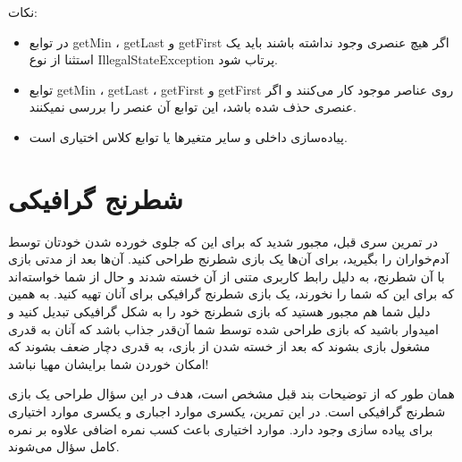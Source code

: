 \documentclass[]{article}
\begin{document}
نکات:
\begin{itemize}
\item در توابع getMin ، getLast و getFirst اگر هیچ عنصری وجود نداشته باشند باید یک استثنا از نوع IllegalStateException پرتاب شود.

\item توابع getMin ، getLast ، getFirst و getFirst روی عناصر موجود کار می‌کنند و اگر عنصری حذف شده باشد، این توابع آن عنصر را بررسی نمیکنند.
\item پیاده‌سازی داخلی و سایر متغیرها یا توابع کلاس اختیاری است.

\end{itemize}
\newpage




\section{شطرنج گرافیکی}


در تمرین سری قبل، مجبور شدید که برای این که جلوی خورده شدن خودتان توسط آدم‌خواران را بگیرید، برای آن‌ها یک بازی شطرنج طراحی کنید. آن‌ها بعد از مدتی بازی با آن شطرنج، به دلیل رابط کاربری متنی از آن خسته شدند و حال از شما خواسته‌اند که برای این که شما را نخورند، یک بازی شطرنج گرافیکی برای آنان تهیه کنید. به همین دلیل شما هم مجبور هستید که بازی شطرنج خود را به شکل گرافیکی تبدیل کنید و امیدوار باشید که بازی طراحی شده توسط شما آن‌قدر جذاب باشد که آنان به قدری مشغول بازی بشوند که بعد از خسته شدن از بازی، به قدری دچار ضعف بشوند که امکان خوردن شما برایشان مهیا نباشد!




همان طور که از توضیحات بند قبل مشخص است، هدف در این سؤال طراحی یک بازی شطرنج گرافیکی است.
در این تمرین، یکسری موارد اجباری و یکسری موارد اختیاری برای پیاده سازی وجود دارد. موارد اختیاری باعث کسب نمره اضافی علاوه بر نمره کامل سؤال می‌شوند.
\end{document}
